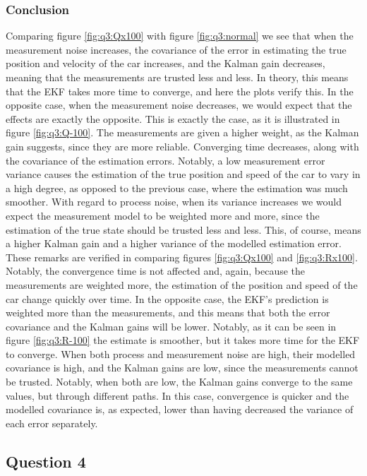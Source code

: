 \subsubsection{Conclusion}
	Comparing figure \ref{fig:q3:Qx100} with figure \ref{fig:q3:normal} we see that when the measurement noise increases,
	the covariance of the error in estimating the true position and velocity of the car increases, and the Kalman gain decreases,
	meaning that the measurements are trusted less and less. In theory, this means that the EKF takes more time to converge,
	and here the plots verify this. In the opposite case,	when the measurement noise decreases, we would expect that the effects
	are exactly the opposite. This is exactly the case, as it is illustrated in figure \ref{fig:q3:Q-100}.
	The measurements are given a higher weight, as the Kalman gain suggests, since they are more reliable. Converging time decreases,
	along with the covariance of the estimation errors. Notably, a low measurement error variance causes the estimation of the true
	position and speed of the car to vary in a high degree, as opposed to the previous case, where the estimation was much smoother.
	With regard to process noise, when its variance increases we would expect the measurement model to be weighted more and more, since
	the estimation of the true state should be trusted less and less. This, of course, means a higher Kalman gain and a higher
	variance of the modelled estimation error. These remarks are verified in comparing figures \ref{fig:q3:Qx100} and \ref{fig:q3:Rx100}.
	Notably, the convergence time is not affected and, again, because the measurements are weighted more, the estimation of the position
	and speed of the car change quickly over time. In the opposite case, the EKF's prediction is weighted more than the measurements,
	and this means that both the error covariance and the Kalman gains will be lower. Notably, as it can be seen in figure
	\ref{fig:q3:R-100} the estimate is smoother, but it takes more time for the EKF to converge.
	When both process and measurement noise are high, their modelled covariance is high, and the Kalman gains are low, since 
	the measurements cannot be trusted. Notably, when both are low, the Kalman gains converge to the same values, but through different
	paths. In this case, convergence is quicker and the modelled covariance is, as expected, lower than having decreased the variance
	of each error separately.
	
	
\subsection{Question 4}

